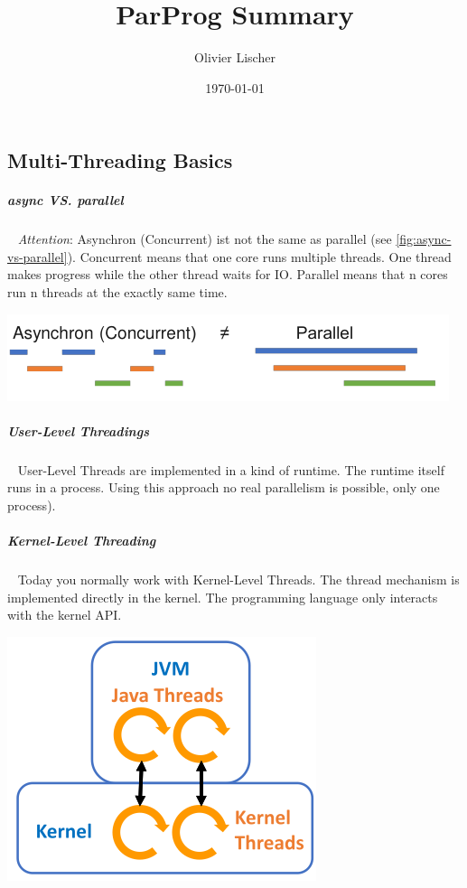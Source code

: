 \documentclass[11pt,twoside,landscape]{article}
\author{Olivier Lischer}
\date{\today}
\title{ParProg Summary}
\begin{document}
\pagestyle{fancy}
\fancyhf{}
\fancyfoot[CE,CO]{\leftmark}
\fancyfoot[R]{\thepage}

\tableofcontents
\newpage

\begin{multicols}{3}
\section{Multi-Threading Basics}
\label{sec:org938e846}
\subparagraph{async VS. parallel} \
\label{sec:orgc04b3a5}
\emph{Attention}: Asynchron (Concurrent) ist not the same as parallel (see \ref{fig:async-vs-parallel}).
Concurrent means that one core runs multiple threads.
One thread makes progress while the other thread waits for IO.
Parallel means that n cores run n threads at the exactly same time.

{
\begin{center}
\includegraphics[width=.9\linewidth]{img/async_vs_concurrent.png}
\end{center}
\label{fig:async-vs-parallel}
}

\subparagraph{User-Level Threadings} \
\label{sec:org622226d}
User-Level Threads are implemented in a kind of runtime. 
The runtime itself runs in a process.
Using this approach no real parallelism is possible, only one process).

\subparagraph{Kernel-Level Threading} \
\label{sec:org27c4833}
Today you normally work with Kernel-Level Threads.
The thread mechanism is implemented directly in the kernel.
The programming language only interacts with the kernel API.


{
\begin{center}
\includegraphics[width=.9\linewidth]{img/kernel_level_threads.png}
\end{center}
\label{fig:kernel-level-threads}
}


\end{multicols}
\end{document}
